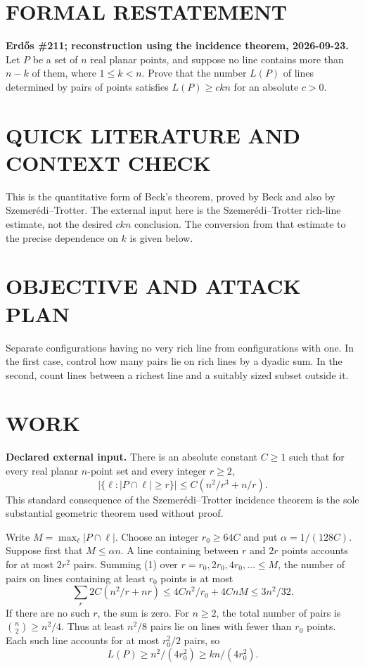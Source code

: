 \section{FORMAL RESTATEMENT}
\textbf{Erd\H{o}s \#211; reconstruction using the incidence theorem, 2026-09-23.}
Let $P$ be a set of $n$ real planar points, and suppose no line contains more than $n-k$ of them, where $1\leq k<n$. Prove that the number $L(P)$ of lines determined by pairs of points satisfies $L(P)\geq ckn$ for an absolute $c>0$.

\section{QUICK LITERATURE AND CONTEXT CHECK}
This is the quantitative form of Beck's theorem, proved by Beck and also by Szemer\'edi--Trotter. The external input here is the Szemer\'edi--Trotter rich-line estimate, not the desired $ckn$ conclusion. The conversion from that estimate to the precise dependence on $k$ is given below.

\section{OBJECTIVE AND ATTACK PLAN}
Separate configurations having no very rich line from configurations with one. In the first case, control how many pairs lie on rich lines by a dyadic sum. In the second, count lines between a richest line and a suitably sized subset outside it.

\section{WORK}
\textbf{Declared external input.} There is an absolute constant $C\geq1$ such that for every real planar $n$-point set and every integer $r\geq2$,
\[
|\{\ell:|P\cap\ell|\geq r\}|\leq C(n^2/r^3+n/r).
\tag{1}
\]
This standard consequence of the Szemer\'edi--Trotter incidence theorem is the sole substantial geometric theorem used without proof.

Write $M=\max_\ell|P\cap\ell|$. Choose an integer $r_0\geq64C$ and put $\alpha=1/(128C)$. Suppose first that $M\leq\alpha n$. A line containing between $r$ and $2r$ points accounts for at most $2r^2$ pairs. Summing (1) over $r=r_0,2r_0,4r_0,\ldots\leq M$, the number of pairs on lines containing at least $r_0$ points is at most
\[
\sum_r2C(n^2/r+nr)
\leq4Cn^2/r_0+4CnM
\leq 3n^2/32.
\tag{2}
\]
If there are no such $r$, the sum is zero. For $n\geq2$, the total number of pairs is $\binom n2\geq n^2/4$. Thus at least $n^2/8$ pairs lie on lines with fewer than $r_0$ points. Each such line accounts for at most $r_0^2/2$ pairs, so
\[
L(P)\geq n^2/(4r_0^2)\geq kn/(4r_0^2).
\tag{3}
\]

